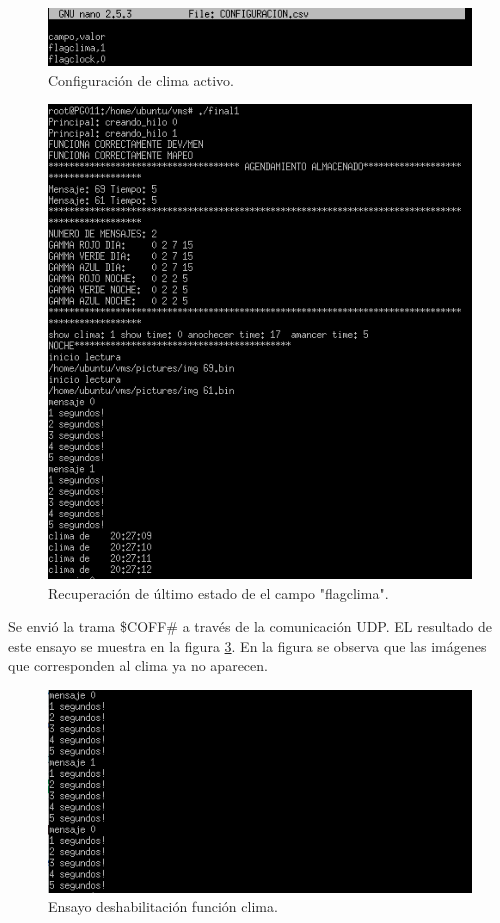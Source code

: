 \begin{figure}[htpb]
	\centering
	\includegraphics[scale=0.8]{Figures/pruebaclima2.png} 
	\caption{Configuración de clima activo.}
	\label{fig: ensayo clima 2}
\end{figure}

\begin{figure}[htpb]
	\centering
	\includegraphics[scale=0.8]{Figures/pruebaclima3.png} 
	\caption{Recuperación de último estado de el campo "flagclima".}
	\label{fig: ensayo clima 3}
\end{figure}

Se envió la trama \$COFF\# a través de la comunicación UDP.  EL resultado de este ensayo se muestra en la figura \ref{fig: pruebas clima 2}. En la figura se observa que las imágenes que corresponden al clima ya no aparecen.

\begin{figure}[htpb]
	\centering
	\includegraphics[scale=0.8]{Figures/prubasclimaoff.png} 
	\caption{Ensayo deshabilitación función clima.}
	\label{fig: pruebas clima 2}
\end{figure}

